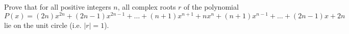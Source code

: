 Prove that for all positive integers $n$,  all complex roots $r$ of the polynomial\[P(x) = (2n)x^{2n} + (2n-1)x^{2n-1} + \dots + (n+1)x^{n+1} + nx^n + (n+1)x^{n-1} + \dots + (2n-1)x + 2n\]lie on the unit circle (i.e. $|r| = 1$).